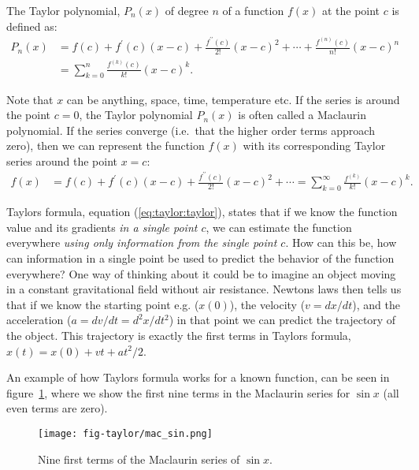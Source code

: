 \documentclass[graybox,sectrefs,envcountresetchap,open=right,final]{svmonodo}
\newenvironment{graybox2admon}[1][]{
\begin{graybox2mdframed}[frametitle=#1]
}
{
\end{graybox2mdframed}
}
\begin{document}
\begin{graybox2admon}[Taylor polynomial:]
The Taylor polynomial, $P_n(x)$ of degree $n$ of a function $f(x)$ at the point $c$ is defined as:
\begin{align}
 P_n(x) &= f(c)+f^\prime(c)(x-c)+\frac{f^{\prime\prime}(c)}{2!}(x-c)^2+\cdots+\frac{f^{(n)}(c)}{n!}(x-c)^n\nonumber\\ 
&=\sum_{k=0}^n\frac{f^{(k)}(c)}{k!}(x-c)^k.\label{eq:taylor:taylori}
\end{align}
\end{graybox2admon}



Note that $x$ can be anything, space, time, temperature etc. If the series is around the point $c=0$, the Taylor polynomial $P_n(x)$ is often called a Maclaurin polynomial. If the series converge (i.e.~that the higher order terms approach zero), then we can represent the function $f(x)$ with its corresponding Taylor series around the point $x=c$:
\begin{align}
 f(x) &= f(c)+f^\prime(c)(x-c)+\frac{f^{\prime\prime}(c)}{2!}(x-c)^2+\cdots
=\sum_{k=0}^\infty\frac{f^{(k)}}{k!}(x-c)^k.\label{eq:taylor:taylor}
\end{align}


\begin{graybox2admon}[The magic of Taylors formula]
Taylors formula, equation (\ref{eq:taylor:taylor}), states that if we know the function value and its gradients \emph{in a single point $c$}, we can estimate the function everywhere \emph{using only  information from the single point $c$}. How can this be, how can information in a single point be used to predict the behavior of the function everywhere? One way of thinking about it could be to imagine an object moving in a constant gravitational field without air resistance. Newtons laws then tells us that  if we know the starting point e.g. ($x(0)$), the velocity ($v=dx/dt$), and the acceleration ($a=dv/dt=d^2x/dt^2$) in that point we can predict the trajectory of the object. This trajectory is exactly the first terms in Taylors formula, $x(t)=x(0) + vt+at^2/2$.
\end{graybox2admon}



An example of how Taylors formula works for a known function, can be seen in figure~\ref{fig:mac_sin}, where we show the first nine terms in the Maclaurin series for $\sin x$ (all even terms are zero). 

\begin{figure}[!ht]  %
  \centerline{\texttt{[image: fig-taylor/mac\_sin.png]}}
  \caption{
  Nine first terms of the Maclaurin series of $\sin x$. \label{fig:mac_sin}
  }
\end{figure}
\end{document}
